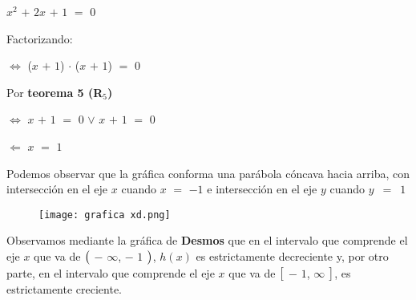 \documentclass[12pt]{article}
\begin{document}
\hspace{4cm} $x^{2}$ $+$ $2x$ $+$ $1$ $=$ $0$ \vspace{0.5cm}

Factorizando: \vspace{0.5cm}

\hspace{4cm} $\Longleftrightarrow$ ($x$ $+$ $1$) $\cdot$ ($x$ $+$ $1$) $=$ $0$ \vspace{0.5cm}

Por {\textcolor{carrotorange}{\bfseries{teorema 5 (R$_{5}$)}}}

\hspace{4cm} $\Longleftrightarrow$ $x$ $+$ $1$ $=$ $0$ $\vee$ $x$ $+$ $1$ $=$ $0$ \vspace{0.5cm}

\hspace{4cm} $\Longleftarrow$ $x$ $=$ $1$ \vspace{0.5cm}

Podemos observar que la gráfica conforma una parábola cóncava hacia arriba, con intersección en el eje $x$ cuando $x$ $=$ $-1$ e intersección en el eje $y$ cuando \mbox{$y$ $=$ $1$} 

\begin{figure}[htb] \centering

    \texttt{[image: grafica xd.png]} 
    
\end{figure} 

\newpage


Observamos mediante la gráfica de {\textcolor{tropicalrainforest}{\bfseries{Desmos}}} que en el intervalo que comprende el eje $x$ que va de $\big{(}$ $-$ $\infty$, $-$ $1$ $\big{)}$, $h(x)$ es estrictamente decreciente y, por otro parte, en el intervalo que comprende el eje $x$ que va de $\big{[}$ $-$ $1$, $\infty$ $\big{]}$, es estrictamente creciente. \vspace{0.5cm}
\end{document}
